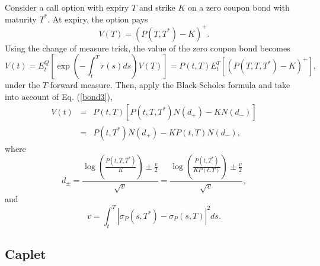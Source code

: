 \documentclass[12pt]{article}
\begin{document}
    Consider a call option with expiry $T$ and strike $K$ on a zero coupon bond with maturity $T^*$. At expiry, the
    option pays
    \begin{equation}
      V(T)=\left(P(T,T^*)-K\right)^+.
    \end{equation}
    Using the change of measure trick, the value of the zero coupon bond becomes
    \begin{equation}
      V(t)=E_t^Q\left[\exp\left(-\int_t^Tr(s)ds\right)V(T)\right]=P(t,T)E_t^T\left[\left(P(T,T,T^*)-K\right)^+\right],
    \end{equation}
    under the $T$-forward measure. Then, apply the Black-Scholes formula and take into account of Eq. (\ref{bond3}),
    \begin{eqnarray}
      V(t) &=& P(t,T)\left[P(t,T,T^*)N(d_+)-KN(d_-)\right] \nonumber\\
           &=& P(t,T^*)N(d_+) - KP(t,T)N(d_-),
      \label{zcbo}
    \end{eqnarray}
    where
    \begin{equation}
      d_{\pm} = \frac{\displaystyle\log\left(\frac{P(t,T,T^*)}{K}\right)\pm \frac{v}{2}}{\sqrt{v}}
             = \frac{\displaystyle\log\left(\frac{P(t,T^*)}{KP(t,T)}\right)\pm \frac{v}{2}}{\sqrt{v}},
    \end{equation}
    and
    \begin{equation}
      v=\int_t^T\left|\sigma_P(s,T^*)-\sigma_P(s,T)\right|^2ds.
    \end{equation}

  \subsection{Caplet}
\end{document}
